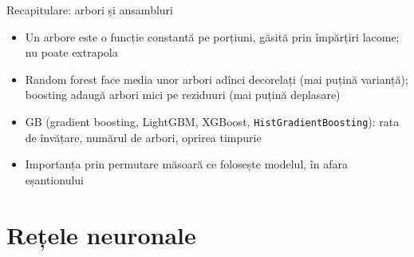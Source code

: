 \begin{frame}{Recapitulare: arbori și ansambluri}
\itemsize{\small}
\begin{itemize}
    \item Un arbore este o funcție constantă pe porțiuni, găsită prin împărțiri lacome; nu poate extrapola
    \item Random forest face media unor arbori adînci decorelați (mai puțină varianță); boosting adaugă arbori mici pe reziduuri (mai puțină deplasare)
    \item GB (gradient boosting, LightGBM, XGBoost, \texttt{HistGradientBoosting}): rata de învățare, numărul de arbori, oprirea timpurie
    \item Importanța prin permutare măsoară ce folosește modelul, în afara eșantionului
\end{itemize}
\end{frame}


\section{Rețele neuronale}

